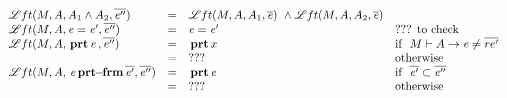 $\begin{array}{lcll}
{\mathcal L}ft( M, A, A_1 \wedge A_2, \overline {\mathit{e}''} ) & = & {\mathcal L}ft( M, A, A_1, \overline {\mathit{e}} ) \ \wedge {\mathcal L}ft( M, A, A_2, \overline {\mathit{e}} )
\\
{\mathcal L}ft( M, A, \mathit{e}=\mathit{e}', \overline {\mathit{e}''} )  & = & {\mathit{e}=\mathit{e}'}  & \mbox{??? to check} 
\\
{\mathcal L}ft( M, A,  {\, \mathbf{prt}\, \mathit{e}\, }, \overline {\mathit{e}''} )  & = &   {\, \mathbf{prt}\, x\, }  & \mbox{if }  \ M \vdash A \rightarrow \mathit{e} \neq  {\overline {re'}} \\
 & = &   ???  & \mbox{otherwise}
\\
{\mathcal L}ft( M, A,  {\, \mathit{e}\, \mathbf{prt\!\!-\!\!frm}\, \overline {\mathit{e}'}} , \overline {\mathit{e}''} )  & = &   {\, \mathbf{prt}\, \mathit{e}\, } & \mbox{if } \  {\overline {\mathit{e}'}} \subset {\overline {\mathit{e}''}} 
\\
   & = &   ???  & \mbox{otherwise}
\end{array}$



